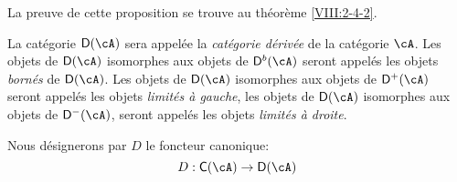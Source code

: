 La preuve de cette proposition se trouve au th\'eor\`eme \ref{VIII:2-4-2}. 





\begin{definition}\label{VIII:3-1-3}
La cat\'egorie $\D(\cA)$ sera appel\'ee la \emph{cat\'egorie d\'eriv\'ee} de la 
cat\'egorie $\cA$. Les objets de $\D(\cA)$ isomorphes aux objets de $\D^b(\cA)$ 
seront appel\'es les objets \emph{born\'es} de $\D(\cA)$. Les objets de 
$\D(\cA)$ isomorphes aux objets de $\D^+(\cA)$ seront appel\'es les objets 
\emph{limit\'es \`a gauche}, les objets de $\D(\cA)$ isomorphes aux objets de 
$\D^-(\cA)$, seront appel\'es les objets \emph{limit\'es \`a droite}. 
\end{definition}

Nous d\'esignerons par $D$ le foncteur canonique: 
\[
  D : \eC(\cA) \to \D(\cA) 
\]















